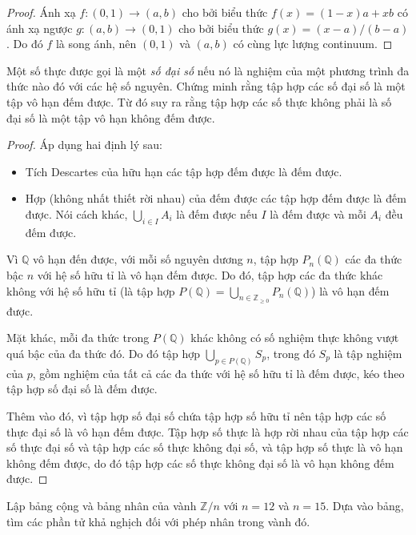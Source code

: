 \begin{proof}
    Ánh xạ $f: (0, 1)\to (a, b)$ cho bởi biểu thức $f(x) = (1 - x)a + xb$ có ánh xạ ngược $g: (a, b)\to (0, 1)$ cho bởi biểu thức $g(x) = (x - a)/(b - a)$. Do đó $f$ là song ánh, nên $(0, 1)$ và $(a, b)$ có cùng lực lượng continuum.
\end{proof}

\begin{exercise}
    Một số thực được gọi là một \textit{số đại số} nếu nó là nghiệm của một phương trình đa thức nào đó với các hệ số nguyên. Chứng minh rằng tập hợp các số đại số là một tập vô hạn đếm được. Từ đó suy ra rằng tập hợp các số thực không phải là số đại số là một tập vô hạn không đếm được.
\end{exercise}

\begin{proof}
    Áp dụng hai định lý sau:
    \begin{itemize}
        \item Tích Descartes của hữu hạn các tập hợp đếm được là đếm được.
        \item Hợp (không nhất thiết rời nhau) của đếm được các tập hợp đếm được là đếm được. Nói cách khác, $\bigcup_{i\in I}A_{i}$ là đếm được nếu $I$ là đếm được và mỗi $A_{i}$ đều đếm được.
    \end{itemize}

    Vì $\mathbb{Q}$ vô hạn đến được, với mỗi số nguyên dương $n$, tập hợp $P_{n}(\mathbb{Q})$ các đa thức bậc $n$ với hệ số hữu tỉ là vô hạn đếm được. Do đó, tập hợp các đa thức khác không với hệ số hữu tỉ (là tập hợp $P(\mathbb{Q}) = \bigcup_{n\in\mathbb{Z}_{\geq 0}}P_{n}(\mathbb{Q})$) là vô hạn đếm được.
    
    Mặt khác, mỗi đa thức trong $P(\mathbb{Q})$ khác không có số nghiệm thực không vượt quá bậc của đa thức đó. Do đó tập hợp $\bigcup_{p\in P(\mathbb{Q})} S_{p}$, trong đó $S_{p}$ là tập nghiệm của $p$, gồm nghiệm của tất cả các đa thức với hệ số hữu tỉ là đếm được, kéo theo tập hợp số đại số là đếm được.

    Thêm vào đó, vì tập hợp số đại số chứa tập hợp số hữu tỉ nên tập hợp các số thực đại số là vô hạn đếm được. Tập hợp số thực là hợp rời nhau của tập hợp các số thực đại số và tập hợp các số thực không đại số, và tập hợp số thực là vô hạn không đếm được, do đó tập hợp các số thực không đại số là vô hạn không đếm được.
\end{proof}

\begin{exercise}Lập bảng cộng và bảng nhân của vành $\mathbb{Z}/n$ với $n = 12$ và $n = 15$. Dựa vào bảng, tìm các phần tử khả nghịch đối với phép nhân trong vành đó.
\end{exercise}

